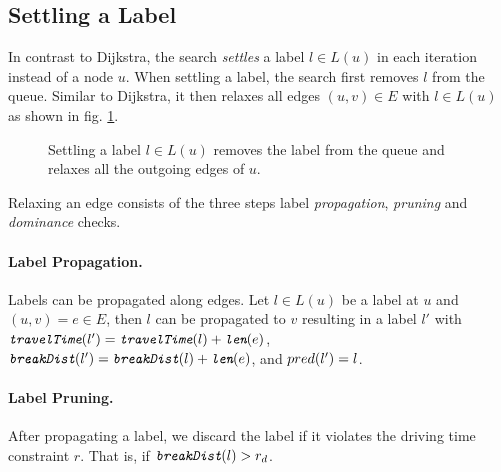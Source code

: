 \subsection{Settling a Label}
In contrast to Dijkstra, the search \emph{settles} a label $l \in L(u)$ in each iteration instead of a node $u$. When settling a label, the search first removes $l$ from the queue. Similar to Dijkstra, it then relaxes all edges $(u,v) \in E$ with $l \in L(u)$ as shown in fig. \ref{alg:settle_next_label}.

\begin{figure}[hbtp]
	\setlength{\interspacetitleruled}{0pt}%
	\setlength{\algotitleheightrule}{0pt}%
	\begin{algorithm*}[H]
		\DontPrintSemicolon


	\end{algorithm*}
	\setlength{\interspacetitleruled}{2pt}%
	\setlength{\algotitleheightrule}{\algotitleheightruledefault}%

	\caption{\label{alg:settle_next_label}Settling a label $l \in L(u)$ removes the label from the queue and relaxes all the outgoing edges of $u$.}
\end{figure}

Relaxing an edge consists of the three steps label \emph{propagation}, \emph{pruning} and \emph{dominance} checks.

\paragraph{Label Propagation.}
Labels can be propagated along edges. Let $l \in L(u)$ be a label at $u$ and $(u,v) = e \in E$, then $l$ can be propagated to $v$ resulting in a label $l'$ with $\texttt{\itshape travelTime}(l') = \texttt{\itshape travelTime}(l) + \texttt{\itshape len}(e)$, $\texttt{\itshape breakDist}(l') = \texttt{\itshape breakDist}(l) + \texttt{\itshape len}(e)$, and $pred(l') = l$.

\paragraph{Label Pruning.}
After propagating a label, we discard the label if it violates the driving time constraint $r$. That is, if $\texttt{\itshape breakDist}(l) > r_d$.


